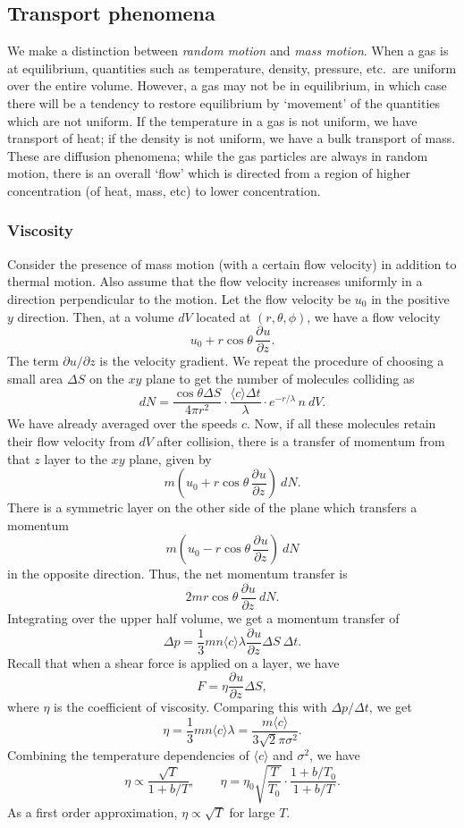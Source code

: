 \documentclass[11pt]{article}
\newcommand\pp[3][]{\frac{\partial^{#1}{#2}}{\partial {#3}^{#1}}}
\newcommand\E[1]{\langle #1 \rangle}
\theoremstyle{definition}
\theoremstyle{remark}
\numberwithin{equation}{section}
\begin{document}
    \subsection{Transport phenomena}
    We make a distinction between \textit{random motion} and \textit{mass motion}.
    When a gas is at equilibrium, quantities such as temperature, density, pressure,
    etc.\ are uniform over the entire volume. However, a gas may not be in
    equilibrium, in which case there will be a tendency to restore equilibrium by
    `movement' of the quantities which are not uniform. If the temperature in a gas
    is not uniform, we have transport of heat; if the density is not uniform, we
    have a bulk transport of mass. These are diffusion phenomena; while the gas
    particles are always in random motion, there is an overall `flow' which is
    directed from a region of higher concentration (of heat, mass, etc) to lower
    concentration.


    \subsubsection{Viscosity}
    Consider the presence of mass motion (with a certain flow velocity) in addition
    to thermal motion. Also assume that the flow velocity increases uniformly in a
    direction perpendicular to the motion. Let the flow velocity be $u_0$ in the
    positive $y$ direction. Then, at a volume $dV$ located at $(r, \theta, \phi)$,
    we have a flow velocity \[
        u_0 + r\cos\theta\,\pp{u}{z}.
    \] The term $\partial u / \partial z$ is the velocity gradient.
    We repeat the procedure of choosing a small area $\Delta S$ on the $xy$ plane to
    get the number of molecules colliding as \[
        dN = \frac{\cos\theta \Delta S}{4\pi r^2}\cdot \frac{\E{c}\Delta
        t}{\lambda}\cdot e^{-r / \lambda}\,n\:dV.
    \] We have already averaged over the speeds $c$. Now, if all these molecules
    retain their flow velocity from $dV$ after collision, there is a transfer of
    momentum from that $z$ layer to the $xy$ plane, given by \[
        m\left(u_0 + r\cos\theta\,\pp{u}{z}\right)\:dN.
    \] There is a symmetric layer on the other side of the plane which transfers a
    momentum \[
        m\left(u_0 - r\cos\theta\,\pp{u}{z}\right)\:dN
    \] in the opposite direction. Thus, the net momentum transfer is \[
        2mr\cos\theta\,\pp{u}{z}\:dN.
    \] Integrating over the upper half volume, we get a momentum transfer of \[
        \Delta p = \frac{1}{3}mn\E{c}\lambda \pp{u}{z}\Delta S\:\Delta t.
    \] Recall that when a shear force is applied on a layer, we have \[
        F = \eta \pp{u}{z}\Delta S,
    \] where $\eta$ is the coefficient of viscosity. Comparing this with $\Delta p /
    \Delta t$, we get \[
        \eta = \frac{1}{3}mn\E{c}\lambda = \frac{m\E{c}}{3\sqrt{2}\pi\sigma^2}.
    \] Combining the temperature dependencies of $\E{c}$ and $\sigma^2$, we have \[
        \eta \propto \frac{\sqrt{T}}{1 + b/ T}, \qquad \eta =
        \eta_0\sqrt{\frac{T}{T_0}} \cdot\frac{1 + b / T_0}{1 + b / T}.
    \] As a first order approximation, $\eta \propto \sqrt{T}$ for large $T$.
\end{document}

